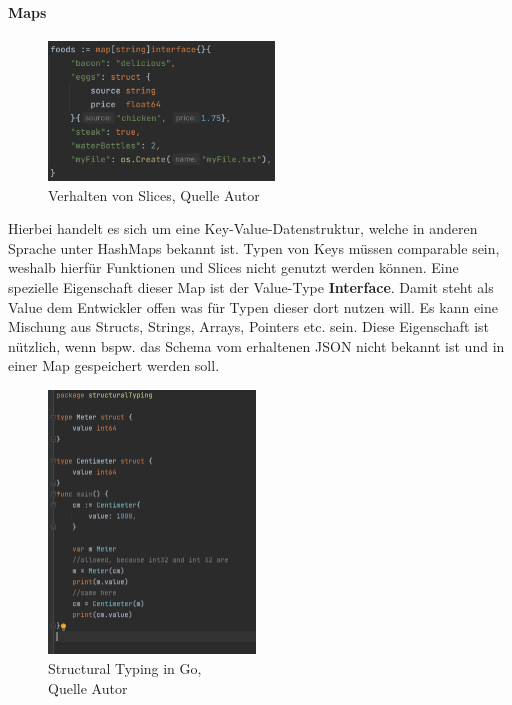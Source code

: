 \documentclass[12pt,titlepage]{article}
\begin{document}
\paragraph{Maps}
\begin{figure}
	\centering
	\includegraphics[width=6cm]{map-example}
	\caption{Verhalten von Slices, Quelle Autor}\label{map}
\end{figure}
Hierbei handelt es sich um eine Key-Value-Datenstruktur, welche in anderen Sprache unter HashMaps bekannt ist.
Typen von Keys müssen comparable sein, weshalb hierfür Funktionen und Slices nicht genutzt werden können.
Eine spezielle Eigenschaft dieser Map ist der Value-Type \textbf{Interface}.
Damit steht als Value dem Entwickler offen was für Typen dieser dort nutzen will.
Es kann eine Mischung aus Structs, Strings, Arrays, Pointers etc. sein.
Diese Eigenschaft ist nützlich, wenn bspw. das Schema vom erhaltenen JSON nicht bekannt ist und in einer Map gespeichert werden soll.

\begin{figure}
	\centering
	\includegraphics[width=5.5cm]{structuralTyping}
	\caption{Structural Typing in Go, \\Quelle Autor}\label{structuralTyping}
\end{figure}
\end{document}
